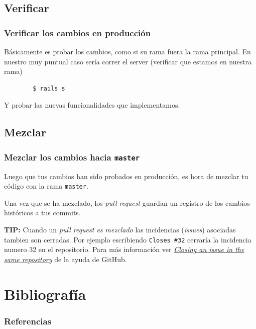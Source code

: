\documentclass[10pt]{beamer}
\begin{document}
\subsection{Verificar}
\begin{frame}[fragile]
	\frametitle{Verificar los cambios en producción}

	Básicamente es probar los cambios, como si su rama fuera la rama principal.  
	En nuestro muy puntual caso sería correr el server (verificar que estamos 
	en nuestra rama)

	\begin{lstlisting}
		$ rails s
	\end{lstlisting}

	Y probar las nuevas funcionalidades que implementamos.
\end{frame}

\subsection{Mezclar}
\begin{frame}[fragile]
	\frametitle{Mezclar los cambios hacia \texttt{master}}
	Luego que tus cambios han sido probados en producción, es hora de mezclar 
	tu código con la rama \texttt{master}.

	Una vez que se ha mezclado, los \textit{pull request} guardan un registro 
	de los cambios históricos a tus commits.

	\textbf{TIP:} Cuando un \textit{pull request es mezclado} las incidencias 
	(\textit{issues}) asociadas tambien son cerradas. Por ejemplo escribiendo 
	\texttt{Closes \#32} cerraría la incidencia numero 32 en el repositorio.  
	Para más información ver 
	\href{https://help.github.com/articles/closing-issues-via-commit-messages/}{\em 
		Closing an issue in the same repository} de la ayuda de GitHub.
\end{frame}


\section{Bibliografía}
\begin{frame}[allowframebreaks]
	\frametitle{Referencias}

	\printbibliography[heading=none]
	\nocite{*}
\end{frame}
\end{document}
